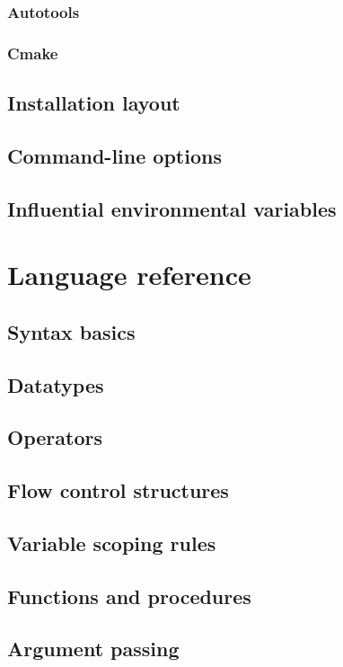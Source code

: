 \documentclass[10pt,titleauthor,openany]{mwbk}
\begin{document}
  \subsection{Autotools}
  
  \subsection{Cmake}
  
  \section{Installation layout}
  \section{Command-line options}
  \section{Influential environmental variables}

  \chapter{Language reference}
  \section{Syntax basics}
  
  \section{Datatypes}
  
  \section{Operators}
  \section{Flow control structures}
  
  \section{Variable scoping rules}
  
  \section{Functions and procedures}
  
  \section{Argument passing}
  
\end{document}
